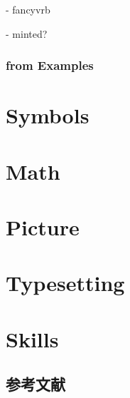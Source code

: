 \documentclass{report}
\begin{document}
- fancyvrb

- minted?


\subsection{from Examples}


\chapter{Symbols}


\chapter{Math}

\chapter{Picture}

\chapter{Typesetting}

\chapter{Skills}
\section{参考文献}
\end{document}
